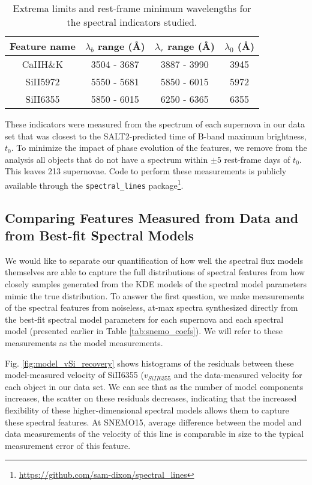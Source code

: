 \begin{table}[ht!]
    \centering
    \begin{tabular}{|c|c|c|c|}\hline
    Feature name & $\lambda_b$ range (\AA) & $\lambda_r$ range (\AA) & $\lambda_0$ (\AA)\\\hline
    CaIIH\&K & 3504 - 3687 & 3887 - 3990 & 3945\\
    SiII5972 & 5550 - 5681 & 5850 - 6015 & 5972\\
    SiII6355 & 5850 - 6015 & 6250 - 6365 & 6355\\\hline
    \end{tabular}
    \caption{Extrema limits and rest-frame minimum wavelengths for the spectral indicators studied.}
    \label{tab:spec_feat_info}
\end{table}
These indicators were measured from the spectrum of each supernova in our data set that was closest to the SALT2-predicted time of B-band maximum brightness, $t_0$. To minimize the impact of phase evolution of the features, we remove from the analysis all objects that do not have a spectrum within $\pm 5$ rest-frame days of $t_0$. This leaves 213 supernovae. Code to perform these measurements is publicly available through the \verb|spectral_lines| package\footnote{\url{https://github.com/sam-dixon/spectral_lines}}.

\subsection{Comparing Features Measured from Data and from Best-fit Spectral Models}
We would like to separate our quantification of how well the spectral flux models themselves are able to capture the full distributions of spectral features from how closely samples generated from the KDE models of the spectral model parameters mimic the true distribution. To answer the first question, we make measurements of the spectral features from noiseless, at-max spectra synthesized directly from the best-fit spectral model parameters for each supernova and each spectral model (presented earlier in Table \ref{tab:snemo_coefs}). We will refer to these measurements as the model measurements.

Fig. \ref{fig:model_vSi_recovery} shows histograms of the residuals between these model-measured velocity of SiII6355 ($v_{SiII6355}$ and the data-measured velocity for each object in our data set. We can see that as the number of model components increases, the scatter on these residuals decreases, indicating that the increased flexibility of these higher-dimensional spectral models allows them to capture these spectral features. At SNEMO15, average difference between the model and data measurements of the velocity of this line is comparable in size to the typical measurement error of this feature.

